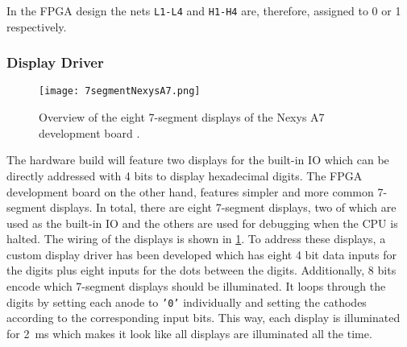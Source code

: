 In the \gls{FPGA} design the nets \texttt{L1-L4} and \texttt{H1-H4} are, therefore, assigned to 0 or 1 respectively.

\subsubsection{Display Driver}
\begin{figure}
  \centering
  \texttt{[image: 7segmentNexysA7.png]}
  \caption{Overview of the eight 7-segment displays of the Nexys A7 development board \cite{7segNexys}.}
  \label{fig:7segNexys}
\end{figure}
The hardware build will feature two displays for the built-in \gls{IO} which can be directly addressed with 4 bits to display hexadecimal digits.
The \gls{FPGA} development board on the other hand, features simpler and more common 7-segment displays.
In total, there are eight 7-segment displays, two of which are used as the built-in \gls{IO} and the others are used for debugging when the \gls{CPU} is halted.
The wiring of the displays is shown in \cref{fig:7segNexys}.
To address these displays, a custom display driver has been developed which has eight 4 bit data inputs for the digits plus eight inputs for the dots between the digits.
Additionally, 8 bits encode which 7-segment displays should be illuminated.
It loops through the digits by setting each anode to \texttt{'0'} individually and setting the cathodes according to the corresponding input bits.
This way, each display is illuminated for \qty{2}{\milli\second} which makes it look like all displays are illuminated all the time.

